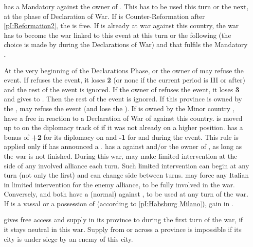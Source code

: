 \phevnt
\aparag \FRA has a Mandatory \CB against the owner of \provinceLombardia. This
\CB has to be used this turn or the next, at the phase of Declaration of
War. If \FRA is Counter-Reformation after \ref{pI:Reformation2}, the \CB is
free.
\aparag If \FRA is already at war against this country, the war has to become
the war linked to this event at this turn or the following (the choice is made
by \FRA during the Declarations of War) and that fulfils the Mandatory \CB.

\phdipl
{}
\bparag At the very beginning of the Declarations Phase, \FRA or the owner of
\provinceLombardia may refuse the event.
\bparag If \FRA refuses the event, it loses {\bf 2} \STAB (or none if the
current period is III or after) and the rest of the event is ignored.
\bparag If the owner of \provinceLombardia refuses the event, it loses {\bf 3}
\STAB and gives \provinceLombardia to \FRA. Then the rest of the event is
ignored. If this province is owned by the \HAB, \SPA may refuse the event (and
lose the \STAB).
If \provinceLombardia is owned by the Minor country \paysMilan, \HAB have a
free \CB in reaction to a Declaration of War of \FRA against this
country. \paysMilan is moved up to \EG on the diplomacy track of \HAB if it
was not already on a higher position.
\FRA has a bonus of {\bf +2} for its diplomacy on \paysToscane and {\bf -1}
for \paysPapaute and \paysParme during the event.
This rule is applied only if \VEN has announced a .
\bparag \VEN has a \CB against \FRA and/or the owner of \provinceLombardia, as
long as the war is not finished.
\bparag During this war, \VEN may make limited intervention at the side of any
involved alliance each turn. Such limited intervention can begin at any turn
(not only the first) and \VEN can change side between turns.  \VEN may force
any Italian \MIN in limited intervention for the enemy alliance, to be fully
involved in the war.
\bparag Conversely, \FRA and \HAB both have a (normal) \CB against \VEN, to be
used at any turn of the war.
If \paysMilan is a vassal or a possession of \HAB (according to
\ref{pI:Habsburg Milano}), \HAB gain \paysSuisse in \CE.

\phmvt
\aparag \paysSavoie gives free access and supply in its province to \FRA
during the first turn of the war, if it stays neutral in this war. Supply from
or across a province is impossible if its city is under siege by an enemy of
this city.

